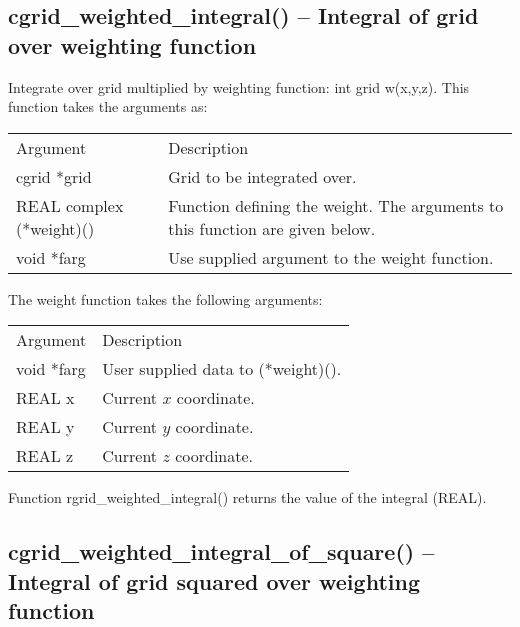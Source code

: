 \documentclass[12pt,letterpaper]{report}
\begin{document}
\subsection{cgrid\_weighted\_integral() -- Integral of grid over weighting function}

Integrate over grid multiplied by weighting function: int grid w(x,y,z). This function takes the arguments as:
\begin{longtable}{p{} p{}}
Argument & Description\\
\cline{1-2}
cgrid *grid & Grid to be integrated over.\\
REAL complex (*weight)() & Function defining the weight. The arguments to this function are given below.\\
void *farg & Use supplied argument to the weight function.\\
\end{longtable}
\noindent
The weight function takes the following arguments:
\begin{longtable}{p{} p{}}
Argument & Description\\
\cline{1-2}
void *farg & User supplied data to (*weight)().\\
REAL x & Current $x$ coordinate.\\
REAL y & Current $y$ coordinate.\\
REAL z & Current $z$ coordinate.\\
\end{longtable}
\noindent
Function rgrid\_weighted\_integral() returns the value of the integral (REAL).

\subsection{cgrid\_weighted\_integral\_of\_square() -- Integral of grid squared over weighting function}
\end{document}
